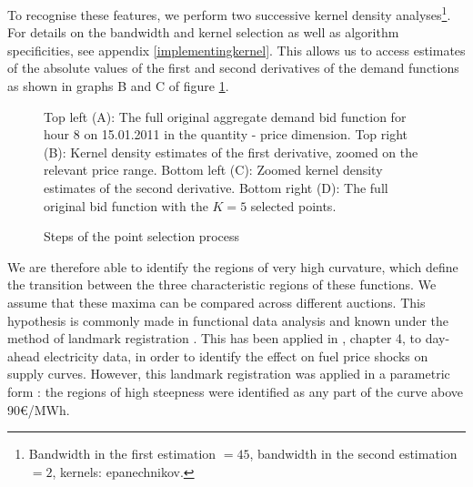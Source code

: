 To recognise these features, we perform two successive kernel density analyses\footnote{Bandwidth in the first estimation $=45$, bandwidth in the second estimation $=2$, kernels: epanechnikov.}. 
For details on the bandwidth and kernel selection as well as algorithm specificities, see appendix \ref{implementingkernel}. This allows us to access estimates of the absolute values of the first and second derivatives of the demand functions as shown in graphs B and C of figure \ref{selectedpoints}.\\ 
\begin{figure}[!ht]
\begin{center}
\caption{Steps of the point selection process}
\label{selectedpoints}
\end{center}
{\small Top left (A): The full original aggregate demand bid function for hour 8 on 15.01.2011 in the quantity - price dimension. Top right (B): Kernel density estimates of the first derivative, zoomed on the relevant price range. Bottom left (C): Zoomed kernel density estimates of the second derivative. Bottom right (D): The full original bid function with the $K=5$ selected points. 
}
\end{figure}

We are therefore able to identify the regions of very high curvature, which define the transition between the three characteristic regions of these functions. We assume that these maxima can be compared across different auctions. This hypothesis is commonly made in functional data analysis and known under the method of landmark registration \cite{ramsaysilverman2005functional}. This has been applied in \cite{wolfi2013interacting}, chapter 4, to day-ahead electricity data, in order to identify the effect on fuel price shocks on supply curves. However, this landmark registration was applied in a parametric form : the regions of high steepness were identified as any part of the curve above 90€/MWh. \\

